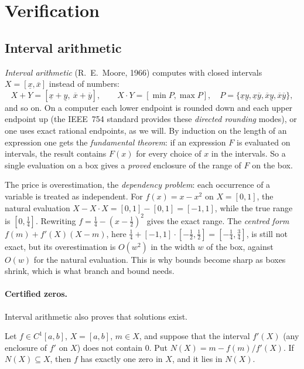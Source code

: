 \section{Verification}
\label{COMP:sec:verify}

\subsection{Interval arithmetic}
\emph{Interval arithmetic} (R.~E.~Moore, 1966) computes with closed intervals $X=[\underline x,\overline x]$
instead of numbers:
\[
  X+Y=[\underline x+\underline y,\ \overline x+\overline y],\qquad
  X\cdot Y=[\min P,\max P],\quad P=\{\underline x\underline y,\underline x\overline y,\overline x\underline y,\overline x\overline y\},
\]
and so on. On a computer each lower endpoint is rounded down and each upper endpoint up (the IEEE~754
standard provides these \emph{directed rounding} modes), or one uses exact rational endpoints, as we will.
By induction on the length of an expression one gets the \emph{fundamental theorem}: if an expression $F$ is
evaluated on intervals, the result contains $F(x)$ for every choice of $x$ in the intervals. So a single
evaluation on a box gives a \emph{proved} enclosure of the range of $F$ on the box.

The price is overestimation, the \emph{dependency problem}: each occurrence of a variable is treated as
independent. For $f(x)=x-x^2$ on $X=[0,1]$, the natural evaluation $X-X\cdot X=[0,1]-[0,1]=[-1,1]$, while the
true range is $[0,\frac14]$. Rewriting $f=\frac14-(x-\frac12)^2$ gives the exact range. The \emph{centred
form} $f(m)+f'(X)(X-m)$, here $\frac14+[-1,1]\cdot[-\frac12,\frac12]=[-\frac14,\frac34]$, is still not exact,
but its overestimation is $O(w^2)$ in the width $w$ of the box, against $O(w)$ for the natural evaluation.
This is why bounds become sharp as boxes shrink, which is what branch and bound needs.

\paragraph{Certified zeros.} Interval arithmetic also proves that solutions exist.

\begin{proposition}\label{COMP:prop:newton}
Let $f\in C^1[a,b]$, $X=[a,b]$, $m\in X$, and suppose that the interval $f'(X)$ (any enclosure of $f'$ on
$X$) does not contain $0$. Put $N(X)=m-f(m)/f'(X)$. If $N(X)\subseteq X$, then $f$ has exactly one zero in $X$,
and it lies in $N(X)$.
\end{proposition}

